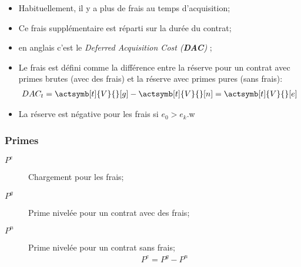 \documentclass[10pt, french]{article}
\begin{document}
\begin{multicols*}{2}
\begin{itemize}[leftmargin = *]
	\item	Habituellement, il y a plus de frais au temps d'acquisition;
	\item	Ce frais supplémentaire est réparti sur la durée du contrat;
	\item	en anglais c'est le \og \textit{Deferred Acquisition Cost (\textbf{DAC})} \fg{};
	\item	Le frais est défini comme la différence entre la réserve pour un contrat avec primes brutes (avec des frais) et la réserve avec primes pures (sans frais):
		\begin{align*}
		DAC_{t}	
		=	\actsymb[t]{V}{}[g] - \actsymb[t]{V}{}[n] 
		= 	\actsymb[t]{V}{}[e]
		\end{align*}
	\item	La réserve est négative pour les frais si $e_{0} > e_{k}$.w
\end{itemize}

\subsubsection{Primes}
\begin{description}
	\item[$P^{e}$]	Chargement pour les frais;
	\item[$P^{g}$]	Prime nivelée pour un contrat avec des frais;
	\item[$P^{n}$]	Prime nivelée pour un contrat sans frais;
		\begin{align*}
		P^{e}	=	P^{g}	-	P^{n}
		\end{align*}
\end{description}





\end{multicols*}
\end{document}
